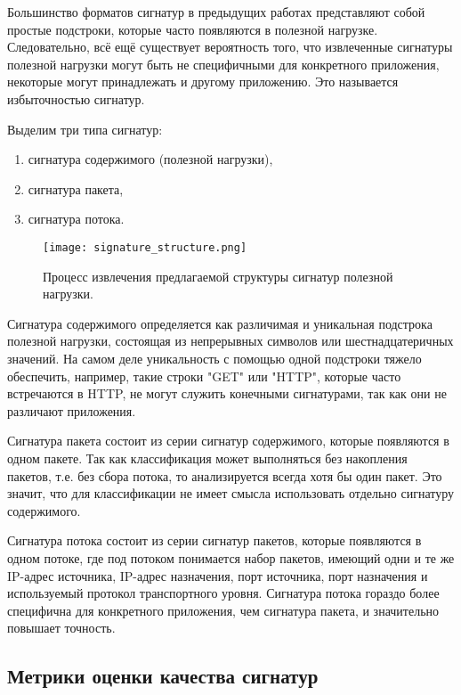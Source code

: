 Большинство форматов сигнатур в предыдущих работах представляют собой простые подстроки, которые часто появляются в полезной нагрузке.
Следовательно, всё ещё существует вероятность того, что извлеченные сигнатуры полезной нагрузки могут быть не специфичными для конкретного приложения,
некоторые могут принадлежать и другому приложению. Это называется избыточностью сигнатур.

Выделим три типа сигнатур:

\begin{enumerate}
    \item сигнатура содержимого (полезной нагрузки),
    \item сигнатура пакета,
    \item сигнатура потока.
\end{enumerate}

\begin{figure}[H]
    \begin{center}
        \texttt{[image: signature\_structure.png]}
        \caption{Процесс извлечения предлагаемой структуры сигнатур полезной нагрузки.}
    \end{center}
\end{figure}

Сигнатура содержимого определяется как различимая и уникальная подстрока полезной нагрузки, состоящая из непрерывных символов или шестнадцатеричных значений.
На самом деле уникальность с помощью одной подстроки тяжело обеспечить, например, такие строки "GET" или "HTTP", которые часто встречаются в HTTP,
не могут служить конечными сигнатурами, так как они не различают приложения.

Сигнатура пакета состоит из серии сигнатур содержимого, которые появляются в одном пакете.
Так как классификация может выполняться без накопления пакетов, т.е. без сбора потока, то анализируется всегда хотя бы один пакет.
Это значит, что для классификации не имеет смысла использовать отдельно сигнатуру содержимого.

Сигнатура потока состоит из серии сигнатур пакетов, которые появляются в одном потоке, где под потоком понимается набор пакетов, имеющий одни и те же
IP-адрес источника, IP-адрес назначения, порт источника, порт назначения и используемый протокол транспортного уровня.
Сигнатура потока гораздо более специфична для конкретного приложения, чем сигнатура пакета, и значительно повышает точность.

\subsection{Метрики оценки качества сигнатур}

